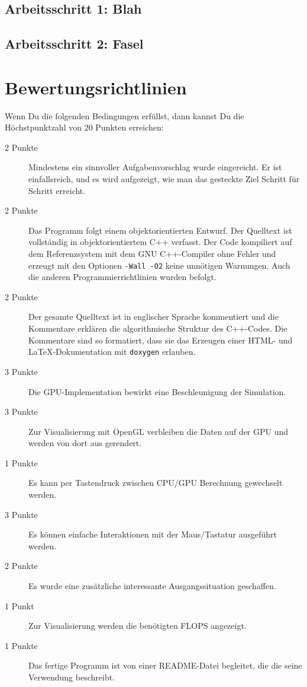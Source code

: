 \documentclass[10pt]{article}
\begin{document}
\begin{multicols}{2}
\subsection{Arbeitsschritt 1: Blah}
\subsection{Arbeitsschritt 2: Fasel}

\section{Bewertungsrichtlinien}

Wenn Du die folgenden Bedingungen erfüllst, dann kannst Du die
Höchstpunktzahl von 20 Punkten erreichen:

\begin{description}
\item[2 Punkte]
        Mindestens ein sinnvoller Aufgabenvorschlag wurde eingereicht.
        Er ist einfallsreich, und es wird aufgezeigt, wie man das gesteckte Ziel
        Schritt für Schritt erreicht.
\item[2 Punkte]
        Das Programm folgt einem objektorientierten Entwurf.
        Der Quelltext ist vollständig in objektorientiertem C++ verfasst.
        Der Code kompiliert auf dem Referenzsystem mit dem GNU C++-Compiler
        ohne Fehler und erzeugt mit den Optionen \texttt{-Wall -O2} keine
        unnötigen Warnungen.
        Auch die anderen Programmierrichtlinien wurden befolgt.
\item[2 Punkte]
        Der gesamte Quelltext ist in englischer Sprache kommentiert und
        die Kommentare erklären die algorithmische Struktur des C++-Codes.
        Die Kommentare sind so formatiert, dass sie das Erzeugen einer
        HTML- und \LaTeX-Dokumentation mit \texttt{doxygen} erlauben. 
\item[3 Punkte] 
        Die GPU-Implementation bewirkt eine Beschleunigung der Simulation.
\item[3 Punkte] 
        Zur Visualisierung mit OpenGL verbleiben die Daten auf der GPU und werden von dort aus gerendert.
\item[1 Punkte]
        Es kann per Tastendruck zwischen CPU/GPU Berechnung gewechselt werden.
\item[3 Punkte] 
        Es können einfache Interaktionen mit der Maus/Tastatur ausgeführt werden.
\item[2 Punkte]
        Es wurde eine zusätzliche interessante Ausgangssituation geschaffen.
\item[1 Punkt]
        Zur Visualisierung werden die benötigten FLOPS angezeigt.
\item[1 Punkte] 
        Das fertige Programm ist von einer README-Datei begleitet, die die
        seine Verwendung beschreibt.

\end{description}




\nocite{*}


\end{multicols}
\end{document}
